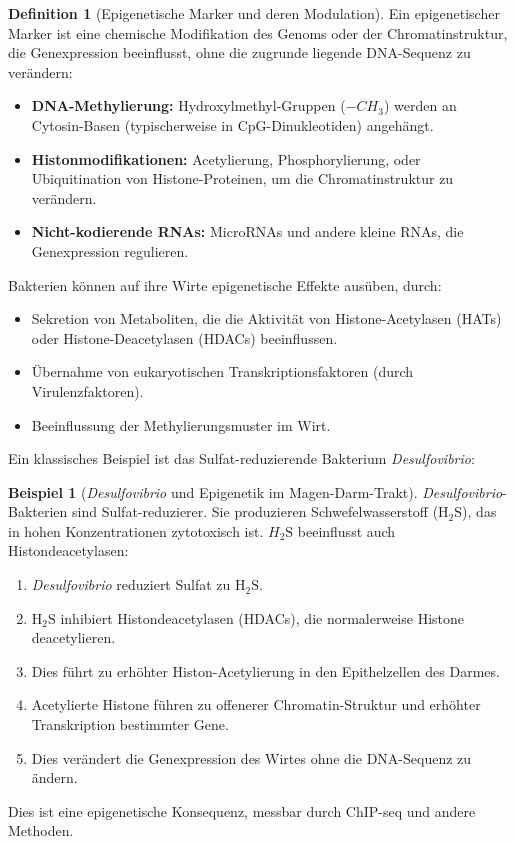 \documentclass[a4paper,12pt]{article}
\theoremstyle{definition}
\newtheorem{definition}{Definition}
\newtheorem{beispiel}{Beispiel}
\begin{document}
\begin{definition}[Epigenetische Marker und deren Modulation]
Ein epigenetischer Marker ist eine chemische Modifikation des Genoms oder der Chromatinstruktur, die Genexpression beeinflusst, ohne die zugrunde liegende DNA-Sequenz zu verändern:

\begin{itemize}
    \item[-] \textbf{DNA-Methylierung:} Hydroxylmethyl-Gruppen ($-CH_{3}$) werden an Cytosin-Basen (typischerweise in CpG-Dinukleotiden) angehängt.
    \item[-] \textbf{Histonmodifikationen:} Acetylierung, Phosphorylierung, oder Ubiquitination von Histone-Proteinen, um die Chromatinstruktur zu verändern.
    \item[-] \textbf{Nicht-kodierende RNAs:} MicroRNAs und andere kleine RNAs, die Genexpression regulieren.
\end{itemize}

Bakterien können auf ihre Wirte epigenetische Effekte ausüben, durch:
\begin{itemize}
    \item[-] Sekretion von Metaboliten, die die Aktivität von Histone-Acetylasen (HATs) oder Histone-Deacetylasen (HDACs) beeinflussen.
    \item[-] Übernahme von eukaryotischen Transkriptionsfaktoren (durch Virulenzfaktoren).
    \item[-] Beeinflussung der Methylierungsmuster im Wirt.
\end{itemize}
\end{definition}

Ein klassisches Beispiel ist das Sulfat-reduzierende Bakterium \textit{Desulfovibrio}:

\begin{beispiel}[\textit{Desulfovibrio} und Epigenetik im Magen-Darm-Trakt]
\textit{Desulfovibrio}-Bakterien sind Sulfat-reduzierer. Sie produzieren Schwefelwasserstoff ($\text{H}_2\text{S}$), das in hohen Konzentrationen zytotoxisch ist. $\textit{H}_2\text{S}$ beeinflusst auch Histondeacetylasen:

\begin{enumerate}
    \item \textit{Desulfovibrio} reduziert Sulfat zu $\text{H}_2\text{S}$.
    \item $\text{H}_2\text{S}$ inhibiert Histondeacetylasen (HDACs), die normalerweise Histone deacetylieren.
    \item Dies führt zu erhöhter Histon-Acetylierung in den Epithelzellen des Darmes.
    \item Acetylierte Histone führen zu offenerer Chromatin-Struktur und erhöhter Transkription bestimmter Gene.
    \item Dies verändert die Genexpression des Wirtes ohne die DNA-Sequenz zu ändern.
\end{enumerate}

Dies ist eine epigenetische Konsequenz, messbar durch ChIP-seq und andere Methoden.
\end{beispiel}
\end{document}
